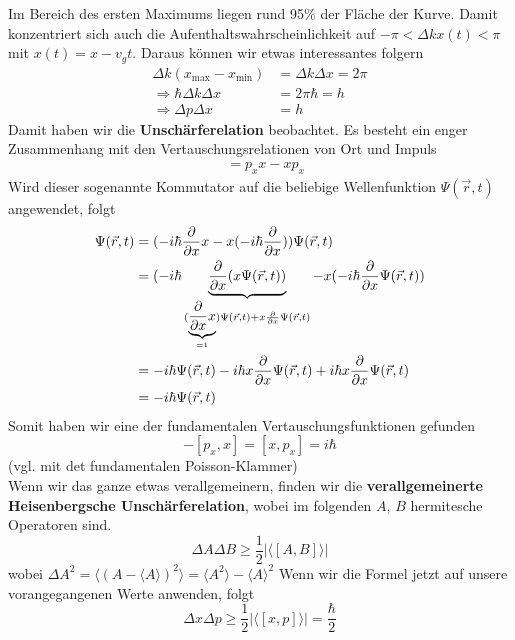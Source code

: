 Im Bereich des ersten Maximums liegen rund 95\% der Fläche der Kurve. Damit konzentriert sich auch die  Aufenthaltswahrscheinlichkeit auf $-\pi < \Delta k x(t) < \pi$ mit $x(t) = x - v_g t$. Daraus können wir etwas interessantes folgern
\begin{align*}
\Delta k (x_\text{max} - x_\text{min}) &= \Delta k \Delta x = 2 \pi\\
\Rightarrow \hbar\Delta k \Delta x &= 2 \pi \hbar = h\\
\Rightarrow \Delta p \Delta x &= h
\end{align*}
Damit haben wir die \textbf{Unschärferelation} beobachtet. Es besteht ein enger Zusammenhang mit den Vertauschungsrelationen von Ort und Impuls
\begin{align*}
	[p_x, x] &= p_x x - x p_x
\end{align*}
Wird dieser sogenannte Kommutator auf die beliebige Wellenfunktion $\Psi(\vec{r}, t)$ angewendet, folgt
\begin{align*}
[p_x, x] \Psi(\vec{r}, t) &= (- i \hbar \fpartial{x} x - x (- i \hbar \fpartial{x})) \Psi(\vec{r}, t)\\
&= (-i\hbar\underbrace{\fpartial{x} (x \Psi(\vec{r}, t))}_{(\underbrace{\fpartial{x} x}_{=1}) \Psi(\vec{r}, t) + x \fpartial{x} \Psi(\vec{r}, t)} - x (- i \hbar \fpartial{x} \Psi(\vec{r}, t))\\
&= - i \hbar \Psi(\vec{r}, t) - i \hbar x \fpartial{x} \Psi(\vec{r}, t) + i \hbar x \fpartial{x} \Psi(\vec{r}, t)\\
&= - i \hbar \Psi(\vec{r}, t)
\end{align*}
Somit haben wir eine der fundamentalen Vertauschungsfunktionen gefunden
$$-[p_x, x] = [x, p_x] = i \hbar$$
(vgl. mit det fundamentalen Poisson-Klammer)\\
Wenn wir das ganze etwas verallgemeinern, finden wir die \textbf{verallgemeinerte Heisenbergsche Unschärferelation}, wobei im folgenden $A$, $B$ hermitesche Operatoren sind.
$$\Delta A \Delta B \geq \frac12 |\langle [A, B] \rangle|$$
wobei $\Delta A^2 = \langle (A - \langle A \rangle)^2 \rangle = \langle A^2 \rangle - \langle A \rangle^2$
Wenn wir die Formel jetzt auf unsere vorangegangenen Werte anwenden, folgt
$$\Delta x \Delta p \geq \frac12 | \langle [x, p] \rangle | = \frac{\hbar}{2}$$


